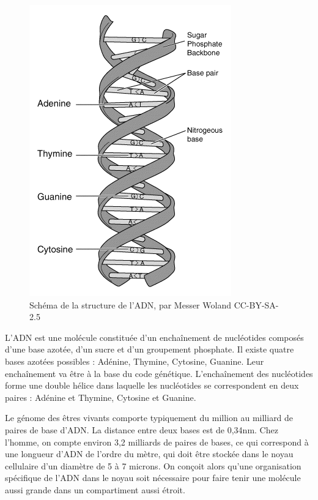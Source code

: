 \begin{figure}
\includegraphics[scale=0.3]{ADN.png}
\caption{Schéma de la structure de l'ADN, par Messer Woland CC-BY-SA-2.5}
\end{figure}

L'ADN est une molécule constituée d'un enchaînement de nucléotides composés d'une base azotée, d'un sucre et d'un groupement phosphate. Il existe quatre bases azotées possibles : Adénine, Thymine, Cytosine, Guanine. Leur enchaînement va être à la base du code génétique.
L'enchaînement des nucléotides forme une double hélice dans laquelle les nucléotides se correspondent en deux paires : Adénine et Thymine, Cytosine et Guanine. 

Le génome des êtres vivants comporte typiquement du million au milliard de paires de base d'ADN. La distance entre deux bases est de 0,34nm. Chez l'homme, on compte environ 3,2 milliards de paires de bases, ce qui correspond à une longueur d'ADN de l'ordre du mètre, qui doit être stockée dans le noyau cellulaire d'un diamètre de 5 à 7 microns. 
On conçoit alors qu'une organisation spécifique de l'ADN dans le noyau soit nécessaire pour faire tenir une molécule aussi grande dans un compartiment aussi étroit. 


